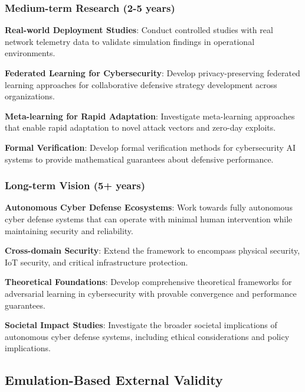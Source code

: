 \documentclass[12pt,oneside]{article}
\begin{document}
\subsubsection{Medium-term Research (2-5 years)}

\textbf{Real-world Deployment Studies}: Conduct controlled studies with real network telemetry data to validate simulation findings in operational environments.

\textbf{Federated Learning for Cybersecurity}: Develop privacy-preserving federated learning approaches for collaborative defensive strategy development across organizations.

\textbf{Meta-learning for Rapid Adaptation}: Investigate meta-learning approaches that enable rapid adaptation to novel attack vectors and zero-day exploits.

\textbf{Formal Verification}: Develop formal verification methods for cybersecurity AI systems to provide mathematical guarantees about defensive performance.

\subsubsection{Long-term Vision (5+ years)}

\textbf{Autonomous Cyber Defense Ecosystems}: Work towards fully autonomous cyber defense systems that can operate with minimal human intervention while maintaining security and reliability.

\textbf{Cross-domain Security}: Extend the framework to encompass physical security, IoT security, and critical infrastructure protection.

\textbf{Theoretical Foundations}: Develop comprehensive theoretical frameworks for adversarial learning in cybersecurity with provable convergence and performance guarantees.

\textbf{Societal Impact Studies}: Investigate the broader societal implications of autonomous cyber defense systems, including ethical considerations and policy implications.


\subsection{Emulation-Based External Validity}
\end{document}
